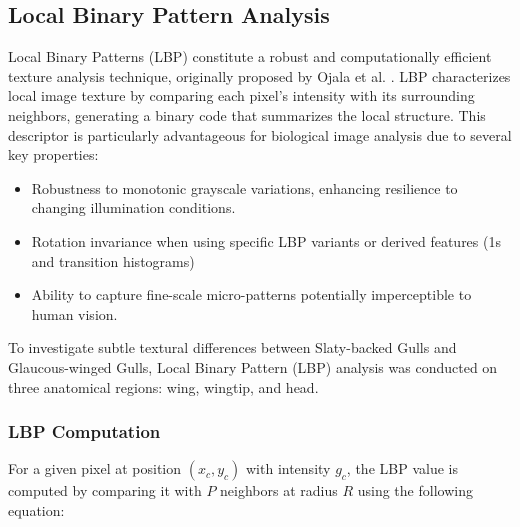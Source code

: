 \documentclass[a4paper,12pt]{report}
\begin{document}
    

\subsection{Local Binary Pattern Analysis}

Local Binary Patterns (LBP) constitute a robust and computationally efficient texture analysis technique, originally proposed by Ojala et al. . LBP characterizes local image texture by comparing each pixel's intensity with its surrounding neighbors, generating a binary code that summarizes the local structure. This descriptor is particularly advantageous for biological image analysis due to several key properties:

\begin{itemize}
    \item Robustness to monotonic grayscale variations, enhancing resilience to changing illumination conditions.
    \item Rotation invariance when using specific LBP variants or derived features (1s and transition histograms)
    \item Ability to capture fine-scale micro-patterns potentially imperceptible to human vision.
\end{itemize}

To investigate subtle textural differences between Slaty-backed Gulls and Glaucous-winged Gulls, Local Binary Pattern (LBP) analysis was conducted on three anatomical regions: wing, wingtip, and head.

\subsubsection{LBP Computation}

For a given pixel at position $(x_c, y_c)$ with intensity $g_c$, the LBP value is computed by comparing it with $P$ neighbors at radius $R$ using the following equation:
\end{document}
